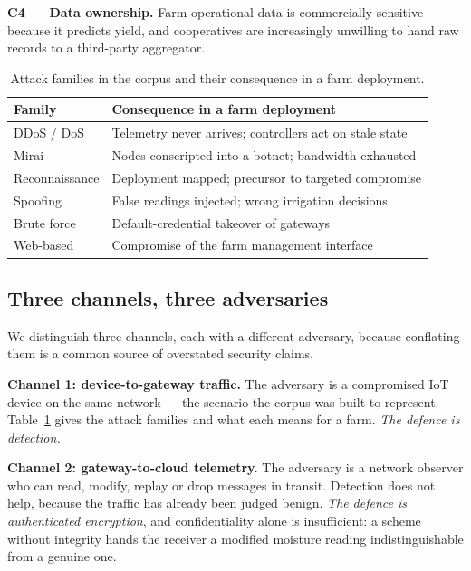 \documentclass[conference]{IEEEtran}
\begin{document}
\textbf{C4 --- Data ownership.} Farm operational data is commercially sensitive because it
predicts yield, and cooperatives are increasingly unwilling to hand raw records to a third-party
aggregator.

\begin{table}[tbp]
\caption{Attack families in the corpus and their consequence in a farm deployment.}
\label{tab:families}
\centering\footnotesize\setlength{\tabcolsep}{3pt}
\begin{tabular}{@{}p{2.1cm}p{6.2cm}@{}}
\toprule
\textbf{Family} & \textbf{Consequence in a farm deployment}\\
\midrule
DDoS / DoS & Telemetry never arrives; controllers act on stale state\\
Mirai & Nodes conscripted into a botnet; bandwidth exhausted\\
Reconnaissance & Deployment mapped; precursor to targeted compromise\\
Spoofing & False readings injected; wrong irrigation decisions\\
Brute force & Default-credential takeover of gateways\\
Web-based & Compromise of the farm management interface\\
\bottomrule
\end{tabular}
\end{table}

\subsection{Three channels, three adversaries}
We distinguish three channels, each with a different adversary, because conflating them is a
common source of overstated security claims.

\textbf{Channel 1: device-to-gateway traffic.} The adversary is a compromised IoT device on the
same network --- the scenario the corpus was built to represent. Table~\ref{tab:families} gives
the attack families and what each means for a farm. \emph{The defence is detection.}

\textbf{Channel 2: gateway-to-cloud telemetry.} The adversary is a network observer who can read,
modify, replay or drop messages in transit. Detection does not help, because the traffic has
already been judged benign. \emph{The defence is authenticated encryption}, and confidentiality
alone is insufficient: a scheme without integrity hands the receiver a modified moisture reading
indistinguishable from a genuine one.
\end{document}
